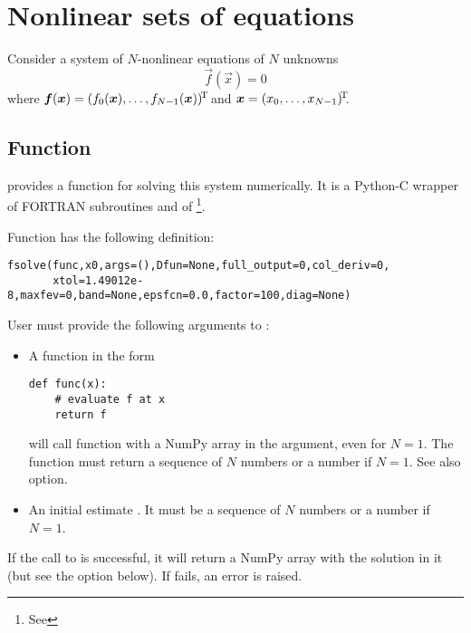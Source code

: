 
\section{Nonlinear sets of equations}
\label{sec:nleqns}

Consider a system of $N$-nonlinear equations of $N$ unknowns
\begin{displaymath}
  \vec f(\vec x)=0
\end{displaymath}
where $\boldsymbol{f}(\boldsymbol{x})=(f_0(\boldsymbol{x}),\ldots,f_{N-1}(\boldsymbol{x}))^{\!\mathrm{T}\!\!}$ and $\boldsymbol{x}=(x_0,\ldots,x_{N-1})^{\!\mathrm{T}\!\!}$.

\subsection{Function }
\label{sec:fsolve}

 provides a function  for solving this
system numerically. It is a Python-C wrapper of FORTRAN subroutines
 and  of \footnote{See
}.

Function  has the following definition:
\begin{verbatim}
fsolve(func,x0,args=(),Dfun=None,full_output=0,col_deriv=0,
       xtol=1.49012e-8,maxfev=0,band=None,epsfcn=0.0,factor=100,diag=None)
\end{verbatim}
User must provide the following arguments to :
\begin{itemize}
\item A function  in the form
\begin{verbatim}
def func(x):
    # evaluate f at x
    return f
\end{verbatim}
   will call function  with a NumPy array in the argument,
  even for $N=1$. The function must return a sequence of
  $N$ numbers or a number if $N=1$. See also  option.
\item An initial estimate . It must be a sequence of $N$
  numbers or a number if $N=1$.
\end{itemize}
If the call to  is successful, it will return a NumPy
array with the solution in it (but see the option 
below). If  fails, an error is raised.



